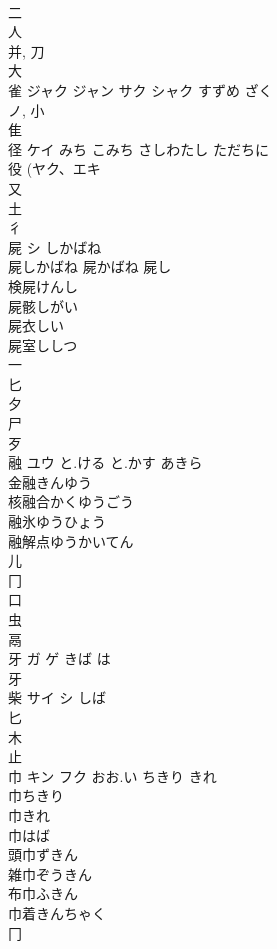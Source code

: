 \documentclass[8pt]{extreport}
\begin{document}
\begin{CJK}{UTF8}{min}
\\	二 
\\	人 
\\	并, 刀 
\\	大 
\\	雀	ジャク ジャン サク シャク	すずめ ざく	
\\	ノ, 小 
\\	隹 
\\	径	ケイ	みち こみち さしわたし ただちに	
\\	役 (ヤク、エキ 
\\	又 
\\	土 
\\	彳 
\\	屍	シ	しかばね	
\\	屍しかばね 屍かばね 屍し 
\\	検屍けんし 
\\	屍骸しがい 
\\	屍衣しい 
\\	屍室ししつ 
\\	一 
\\	匕 
\\	夕 
\\	尸 
\\	歹 
\\	融	ユウ	と.ける と.かす あきら	
\\	金融きんゆう
\\	核融合かくゆうごう
\\	融氷ゆうひょう
\\	融解点ゆうかいてん
\\	儿 
\\	冂 
\\	口 
\\	虫 
\\	鬲 
\\	牙	ガ ゲ	きば は	
\\	牙 
\\	柴	サイ シ	しば	
\\	匕 
\\	木 
\\	止 
\\	巾	キン フク	おお.い ちきり きれ	
\\	巾ちきり 
\\	巾きれ 
\\	巾はば 
\\	頭巾ずきん 
\\	雑巾ぞうきん 
\\	布巾ふきん 
\\	巾着きんちゃく 
\\	冂 

\end{CJK}
\end{document}
